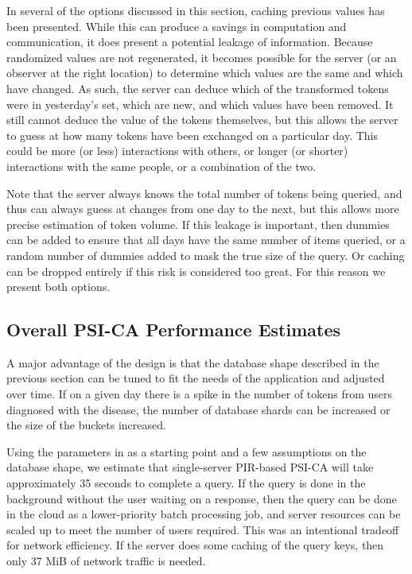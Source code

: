 {	In several of the options discussed in this section, caching previous values has been presented. While this can produce a savings in computation and communication, it does present a potential leakage of information. Because randomized values are not regenerated, it becomes possible for the server (or an observer at the right location) to determine which values are the same and which have changed. As such, the server can deduce which of the transformed tokens were in yesterday's set, which are new, and which values have been removed. It still cannot deduce the value of the tokens themselves, but this allows the server to guess at how many tokens have been exchanged on a particular day. This could be more (or less) interactions with others, or longer (or shorter) interactions with the same people, or a combination of the two.
	
	Note that the server always knows the total number of tokens being queried, and thus can always guess at changes from one day to the next, but this allows more precise estimation of token volume. If this leakage is important, then dummies can be added to ensure that all days have the same number of items queried, or a random number of dummies added to mask the true size of the query. Or caching can be dropped entirely if this risk is considered too great. For this reason we present both options.
}

\subsection{Overall PSI-CA Performance Estimates} 

A major advantage of the \dect design is that the database shape described in the previous section can be tuned to fit the needs of the application and adjusted over time. If on a given day there is a spike in the number of tokens from users diagnosed with the disease, the number of database shards can be increased or the size of the buckets increased.

Using the parameters in  as a starting point and a few assumptions on the database shape, we estimate that single-server PIR-based PSI-CA will take approximately 35 seconds to complete a query. If the query is done in the background without the user waiting on a response, then the query can be done in the cloud as a lower-priority batch processing job, and server resources can be scaled up to meet the number of users required. This was an intentional tradeoff for network efficiency. If the server does some caching of the query keys, then only 37 MiB of network traffic is needed.


